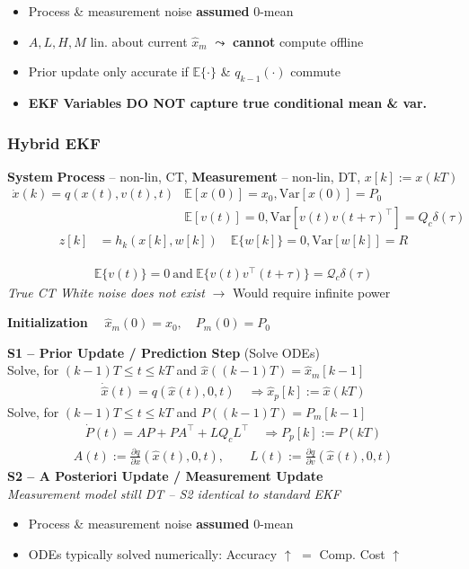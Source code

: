 \begin{itemize}[leftmargin=1em]
    \item Process \& measurement noise \textbf{assumed} 0-mean
    \item $A,L,H,M$ lin. about current $\widehat{x}_m$ $\leadsto$ \textbf{cannot} compute offline
    \item Prior update only accurate if $\mathbb{E}\{\cdot\}$ \& $q_{k-1}(\cdot)$ commute
    \item \textbf{EKF Variables DO NOT capture true conditional mean \& var.}
\end{itemize}

\subsubsection{Hybrid EKF}
\textbf{System} \textbf{Process} -- non-lin, CT, \textbf{Measurement} -- non-lin, DT, $x[k] := x(kT)$
\begin{align*}
    \dot{x}(k) = q(x(t), v(t), t) &\mathbb{E}[x(0)]=x_0, \mathrm{Var}[x(0)] = P_0\\
    &\mathbb{E}[v(t)]=0, \mathrm{Var}[v(t)v(t\!+\!\tau)^\top] = Q_c \delta(\tau)
\end{align*}
\begin{align*}
    z[k] &= h_k(x[k], w[k]) \quad \mathbb{E}\{w[k]\} = 0, \mathrm{Var}[w[k]] = R
\end{align*}

\begin{align*}
    \mathbb{E}\{v(t)\} = 0 \ \mathrm{ and } \ \mathbb{E}\{v(t)v^\top(t+\tau)\} = \mathcal{Q}_c \delta(\tau)
\end{align*}
{\footnotesize
\textit{True CT White noise does not exist} $\to$ Would require infinite power
}


\textbf{Initialization} $\quad\widehat{x}_m(0) = x_0, \quad P_m(0) = P_0$

\textbf{S1 -- Prior Update / Prediction Step} (Solve ODEs)\\
Solve, for $(k-1)T \leq t \leq kT$ and $\hat{x}((k-1)T) = \widehat{x}_m[k-1]$
\begin{align*}
    \dot{\hat{x}}(t) = q(\hat{x}(t),0,t)
    \quad \Rightarrow \hat{x}_p[k] := \hat{x}(kT)
\end{align*}
Solve, for $(k-1)T \leq t \leq kT$ and $P((k-1)T) = P_m[k-1]$
\begin{align*}
    \dot{P}(t) = A P \!+\! PA^\top \!+\! LQ_c L^\top 
    \quad \Rightarrow P_p[k] := P(kT)
\end{align*}
\begin{align*}
    A(t) := 
    \textstyle\frac{\partial q}{\partial x}(\hat{x}(t),0,t),
    \qquad L(t) := 
    \textstyle\frac{\partial q}{\partial v}(\hat{x}(t),0,t)
\end{align*}
\textbf{S2 -- A Posteriori Update / Measurement Update} \\
\textit{Measurement model still DT -- S2 identical to standard EKF}

\begin{itemize}[leftmargin=1em]
    \item Process \& measurement noise \textbf{assumed} 0-mean
    \item ODEs typically solved numerically: Accuracy $\uparrow$ $=$ Comp. Cost $\uparrow$
\end{itemize}